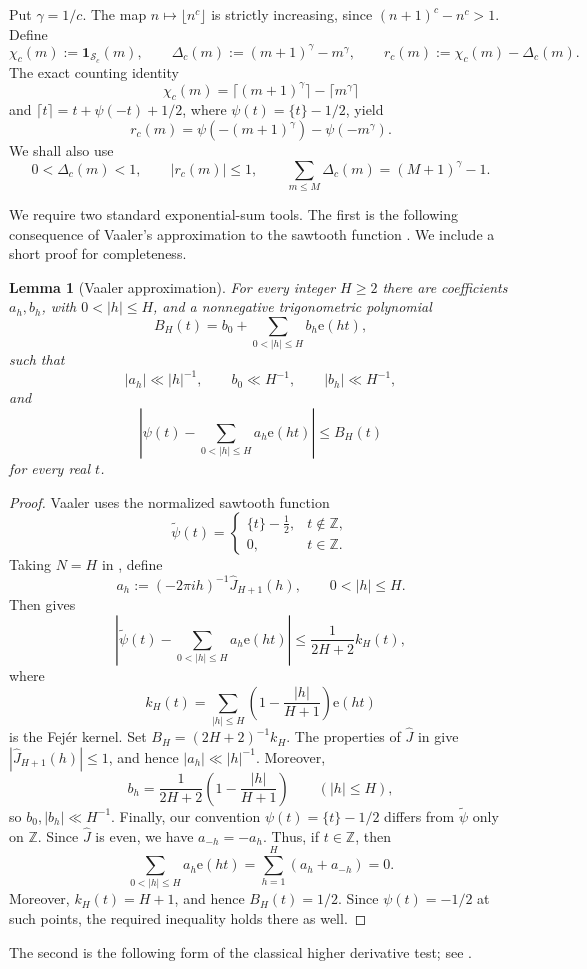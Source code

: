 \documentclass{amsart}
\newcommand{\Z}{\mathbb Z}
\newcommand{\1}{\mathbf 1}
\newcommand{\e}{\mathrm e}
\newcommand{\calS}{\mathcal S}
\newtheorem{lemma}[theorem]{Lemma}
\begin{document}
Put $\gamma=1/c$.  The map $n\mapsto\lfloor n^c\rfloor$ is strictly
increasing, since $(n+1)^c-n^c>1$.  Define
\begin{equation}\label{e:weights}
 \chi_c(m):=\1_{\calS_c}(m),\qquad
 \Delta_c(m):=(m+1)^\gamma-m^\gamma,\qquad
 r_c(m):=\chi_c(m)-\Delta_c(m).
\end{equation}
The exact counting identity
\[
 \chi_c(m)=\lceil(m+1)^\gamma\rceil-\lceil m^\gamma\rceil
\]
and $\lceil t\rceil=t+\psi(-t)+1/2$, where
$\psi(t)=\{t\}-1/2$, yield
\begin{equation}\label{e:sawtooth}
 r_c(m)=\psi(-(m+1)^\gamma)-\psi(-m^\gamma).
\end{equation}
We shall also use
\begin{equation}\label{e:delta-properties}
 0<\Delta_c(m)<1,\qquad |r_c(m)|\leq1,
 \qquad \sum_{m\leq M}\Delta_c(m)=(M+1)^\gamma-1.
\end{equation}

We require two standard exponential-sum tools. The first is the following consequence of Vaaler's approximation to the sawtooth function \cite[Theorem~18, especially~(7.14)]{Vaaler}. We include a short proof for completeness.

\begin{lemma}[Vaaler approximation]\label{l:vaaler}
For every integer $H\geq2$ there are coefficients $a_h,b_h$, with
$0<|h|\leq H$, and a nonnegative trigonometric polynomial
\[
 B_H(t)=b_0+\sum_{0<|h|\leq H}b_h\e(ht),
\]
such that
\[
 |a_h|\ll |h|^{-1},\qquad b_0\ll H^{-1},\qquad
 |b_h|\ll H^{-1},
\]
and
\[
 \left|\psi(t)-\sum_{0<|h|\leq H}a_h\e(ht)\right|
 \leq B_H(t)
\]
for every real $t$.
\end{lemma}

\begin{proof}
Vaaler uses the normalized sawtooth function
\[
 \widetilde\psi(t)=
 \begin{cases}
  \{t\}-\frac12,&t\notin\Z,\\
  0,&t\in\Z.
 \end{cases}
\]
Taking $N=H$ in \cite[Theorem~18]{Vaaler}, define
\[
 a_h:=(-2\pi i h)^{-1}\widehat J_{H+1}(h),
 \qquad 0<|h|\leq H.
\]
Then \cite[(7.14)]{Vaaler} gives
\[
 \left|\widetilde\psi(t)-\sum_{0<|h|\leq H}a_h\e(ht)\right|
 \leq \frac1{2H+2}k_H(t),
\]
where
\[
 k_H(t)=\sum_{|h|\leq H}
 \left(1-\frac{|h|}{H+1}\right)\e(ht)
\]
is the Fej\'er kernel.  Set $B_H=(2H+2)^{-1}k_H$.  The properties of
$\widehat J$ in \cite[Theorem~6]{Vaaler} give
$|\widehat J_{H+1}(h)|\leq1$, and hence
$|a_h|\ll|h|^{-1}$.  Moreover,
\[
 b_h=\frac1{2H+2}\left(1-\frac{|h|}{H+1}\right)
 \qquad (|h|\leq H),
\]
so $b_0,|b_h|\ll H^{-1}$. Finally, our convention $\psi(t)=\{t\}-1/2$ differs from
$\widetilde\psi$ only on $\Z$.  Since $\widehat J$ is even, we have
$a_{-h}=-a_h$.  Thus, if $t\in\Z$, then
\[
 \sum_{0<|h|\leq H}a_h\e(ht)
 =\sum_{h=1}^H(a_h+a_{-h})=0.
\]
Moreover, $k_H(t)=H+1$, and hence $B_H(t)=1/2$.  Since
$\psi(t)=-1/2$ at such points, the required inequality holds there as
well.
\end{proof}
The second is the following form of the classical higher derivative
test; see \cite[Lemma~2.2]{ChanKumchevWierdl}.
\end{document}
